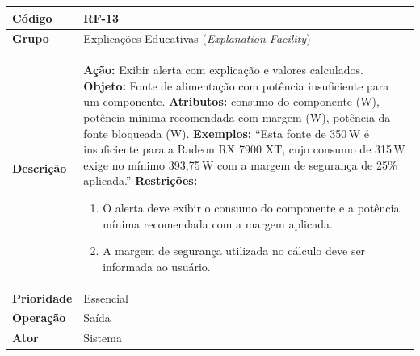 \begin{quadro}[htb]
  \caption{RF-13 -- Exibir alerta de fonte de alimentação subdimensionada}
  \label{quad:rf13}
  \begin{tabular}{|p{3.2cm}|p{11.8cm}|}
    \hline
    \textbf{Código}     & RF-13                                                                                \\ \hline
    \textbf{Grupo}      & Explicações Educativas (\textit{Explanation Facility})                               \\ \hline
    \textbf{Descrição}  &
    \textbf{Ação:} Exibir alerta com explicação e valores calculados.
    \textbf{Objeto:} Fonte de alimentação com potência insuficiente para um componente.
    \textbf{Atributos:} consumo do componente (W), potência mínima recomendada com margem (W), potência da fonte bloqueada (W).
    \textbf{Exemplos:} ``Esta fonte de 350\,W é insuficiente para a Radeon RX 7900 XT, cujo consumo de 315\,W exige no mínimo 393,75\,W com a margem de segurança de 25\% aplicada.''
    \textbf{Restrições:}
    \begin{enumerate}[nosep,leftmargin=1.2em,topsep=2pt,partopsep=0pt,parsep=0pt,itemsep=1pt]
      \item O alerta deve exibir o consumo do componente e a potência mínima recomendada com a margem aplicada.
      \item A margem de segurança utilizada no cálculo deve ser informada ao usuário.
    \end{enumerate} \\ \hline
    \textbf{Prioridade} & Essencial                                                                            \\ \hline
    \textbf{Operação}   & Saída                                                                                \\ \hline
    \textbf{Ator}       & Sistema                                                                              \\ \hline
  \end{tabular}
\end{quadro}

